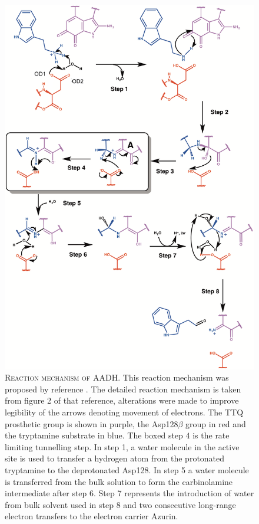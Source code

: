 \begin{figure}[p]
    \centering
    \includegraphics[height=0.8\textheight]{chapters/aadh/figures/aadh_mechanism.png}
    \caption[Reaction mechanism of AADH]{\textsc{Reaction mechanism of AADH}. This reaction mechanism was proposed by reference \cite{masgrauAtomicDescriptionEnzyme2006}. The detailed reaction mechanism is taken from figure 2 of that reference, alterations were made to improve legibility of the arrows denoting movement of electrons. The TTQ prosthetic group is shown in purple, the Asp128$\beta$ group in red and the tryptamine substrate in blue. The boxed step $4$ is the rate limiting tunnelling step. In step 1, a water molecule in the active site is used to transfer a hydrogen atom from the protonated tryptamine to the deprotonated Asp128. In step 5 a water molecule is transferred from the bulk solution to form the carbinolamine intermediate after step 6.  Step 7 represents the introduction of water from bulk solvent used in step 8 and two consecutive long-range electron transfers to the electron carrier Azurin.}
    \label{fig:aadh_mechanism}
\end{figure}

